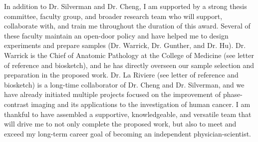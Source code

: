 \documentclass{NIHGrant}
\begin{document}
In addition to Dr. Silverman and Dr. Cheng, I am supported by a strong thesis committee, faculty group, and broader research team who will support, collaborate with, and train me throughout the duration of this award. Several of these faculty maintain an open-door policy and have helped me to design experiments and prepare samples (Dr. Warrick, Dr. Gunther, and Dr. Hu). Dr. Warrick is the Chief of Anatomic Pathology at the College of Medicine (see letter of reference and biosketch), and he has directly overseen our sample selection and preparation in the proposed work. Dr. La Riviere (see letter of reference and biosketch) is a long-time collaborator of Dr. Cheng and Dr. Silverman, and we have already initiated multiple projects focused on the improvement of phase-contrast imaging and its applications to the investigation of human cancer. I am thankful to have assembled a supportive, knowledgeable, and versatile team that will drive me to not only complete the proposed work, but also to meet and exceed my long-term career goal of becoming an independent physician-scientist.


\end{document}
